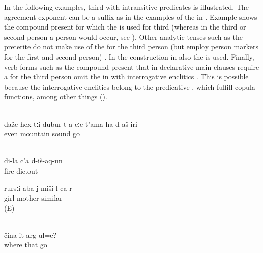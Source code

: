 In the following examples, third  with intransitive predicates is illustrated. The agreement exponent can be a suffix as in the examples of the  in . Example  shows the compound present for which the  is used for third  (whereas in the third or second person a person  would occur, see ). Other analytic tenses such as the preterite do not make use of the  for the third person (but employ person markers for the first and second person) . In the  construction in  also the  is used. Finally, verb forms such as the compound present that in declarative main clauses require a  for the third person omit the  in  with interrogative enclitics . This is possible because the  interrogative enclitics belong to the predicative , which fulfill copula-functions, among other things ().
%
\begin{exe}
		\\	\label{ex:‎The sound went even to the mountains habitual past}
		\gll	daže	hex-tːi	dubur-t-a-cːe	t'ama	ha-d-aš-iri\\
			even		mountain	sound	go\\
		\glt	{}
		
				\\	\label{ex:My fire died out preterite}
		\gll	di-la	c'a	d-iš-aq-un\\
				fire	die.out\\
		\glt	{}
		
			\ex	\label{ex:The daughter is similar to her mother}
	\gll	rursːi	aba-j	miši-l ca-r\\
		girl	mother	similar \\
	\glt	{} (E)
		
		\\	\label{ex:Where is s/he going compound present}
		\gll	čina	it	arg-ul=e?\\
			where	that	go\\
		\glt	{}
\end{exe}

